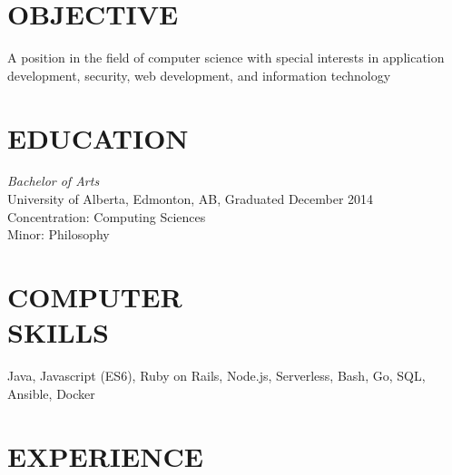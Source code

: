 \documentclass[margin, 10pt]{res} %
\begin{document}
\begin{resume}

 
\section{OBJECTIVE}  

A position in the field of computer science with special interests in application development, security, web development, and information technology 


\section{EDUCATION}

{\sl Bachelor of Arts}\\
University of Alberta, Edmonton, AB, Graduated December 2014 \\
Concentration: Computing Sciences \\
Minor: Philosophy
 

\section{COMPUTER \\ SKILLS} 

Java, Javascript (ES6), Ruby on Rails, Node.js, Serverless, Bash, Go, SQL, Ansible, Docker\\
 
 
\section{EXPERIENCE}


\end{resume}
\end{document}
